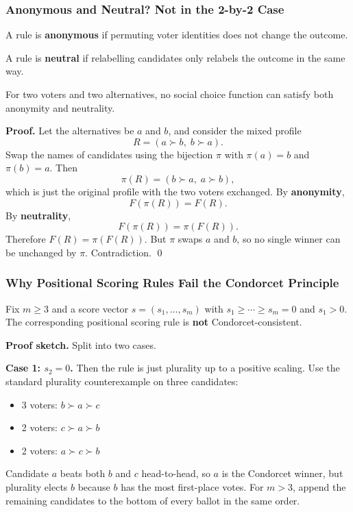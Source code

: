 \separator

\subsubsection{Anonymous and Neutral? Not in the 2-by-2 Case}

\begin{defbox}[Anonymity]
A rule is \textbf{anonymous} if permuting voter identities does not change the outcome.
\end{defbox}

\begin{defbox}[Neutrality]
A rule is \textbf{neutral} if relabelling candidates only relabels the outcome in the same way.
\end{defbox}

\begin{thmbox}
For two voters and two alternatives, no social choice function can satisfy both anonymity and neutrality.
\end{thmbox}

\textbf{Proof.} Let the alternatives be $a$ and $b$, and consider the mixed profile
\[
  R = (a \succ b,\; b \succ a).
\]
Swap the names of candidates using the bijection $\pi$ with $\pi(a)=b$ and $\pi(b)=a$. Then
\[
  \pi(R) = (b \succ a,\; a \succ b),
\]
which is just the original profile with the two voters exchanged. By \textbf{anonymity},
\[
  F(\pi(R)) = F(R).
\]
By \textbf{neutrality},
\[
  F(\pi(R)) = \pi(F(R)).
\]
Therefore $F(R) = \pi(F(R))$. But $\pi$ swaps $a$ and $b$, so no single winner can be unchanged by $\pi$. Contradiction. \qed

\separator

\subsubsection{Why Positional Scoring Rules Fail the Condorcet Principle}

\begin{thmbox}
Fix $m \geq 3$ and a score vector $s=(s_1,\ldots,s_m)$ with $s_1 \geq \cdots \geq s_m = 0$ and $s_1 > 0$. The corresponding positional scoring rule is \textbf{not} Condorcet-consistent.
\end{thmbox}

\textbf{Proof sketch.} Split into two cases.

\textbf{Case 1: $s_2 = 0$.} Then the rule is just plurality up to a positive scaling. Use the standard plurality counterexample on three candidates:
\begin{itemize}
  \item 3 voters: $b \succ a \succ c$
  \item 2 voters: $c \succ a \succ b$
  \item 2 voters: $a \succ c \succ b$
\end{itemize}
Candidate $a$ beats both $b$ and $c$ head-to-head, so $a$ is the Condorcet winner, but plurality elects $b$ because $b$ has the most first-place votes. For $m>3$, append the remaining candidates to the bottom of every ballot in the same order.


